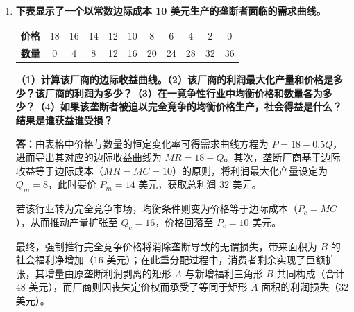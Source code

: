 \begin{enumerate}[label=\textbf{\arabic*.}, leftmargin=*]
		\textbf{答：}在征税前，根据利润函数 $\pi = PQ - C$ 的一阶最大化条件，厂商的边际收益必须等于边际成本。对利润函数求导可得：
		\[
		\begin{aligned}
			\frac{\mathrm{d}\pi}{\mathrm{d}Q} &= \frac{\mathrm{d}}{\mathrm{d}Q} [(120 - 0.02Q)Q - (60Q + 25000)] \\
			&= 60 - 0.04Q = 0
		\end{aligned}
		\]
		解得均衡产量 $Q = 1500$，代入需求曲线得均衡价格 $P = 90$ 美分，此时每周总利润为 $20000$ 美分（即 $200$ 美元）。当政府决定对该产品征收每单位 $14$ 美分的从量税时，厂商的边际成本向上平移，新的利润函数重构为：
		\[
		\begin{aligned}
			\pi &= (120 - 0.02Q)Q - (74Q + 25000) \\
			&= -0.02Q^2 + 46Q - 25000
		\end{aligned}
		\]
		最终，再次应用利润最大化条件，求导可得 $0.04Q = 46$，解得税后产量缩减至 $Q = 1150$，对应的市场价格上升至 $P = 97$ 美分，导致税后每周总利润下降至 $1450$ 美分（即 $14.5$ 美元）。
		\newpage
		\item \textbf{下表显示了一个以常数边际成本 10 美元生产的垄断者面临的需求曲线。}
		\begin{center}
			\begin{tabular}{lcccccccccc}
				\hline
				\textbf{价格} & 18 & 16 & 14 & 12 & 10 & 8 & 6 & 4 & 2 & 0 \\
				\textbf{数量} & 0 & 4 & 8 & 12 & 16 & 20 & 24 & 28 & 32 & 36 \\
				\hline
			\end{tabular}
		\end{center}
		\textbf{（1）计算该厂商的边际收益曲线。（2）该厂商的利润最大化产量和价格是多少？该厂商的利润为多少？（3）在一竞争性行业中均衡价格和数量各为多少？（4）如果该垄断者被迫以完全竞争的均衡价格生产，社会得益是什么？结果是谁获益谁受损？}
		
		\textbf{答：}由表格中价格与数量的恒定变化率可得需求曲线方程为 $P = 18 - 0.5Q$，进而导出其对应的边际收益曲线为 $MR = 18 - Q$。其次，垄断厂商基于边际收益等于边际成本（$MR = MC = 10$）的原则，将利润最大化产量设定为 $Q_m = 8$，此时要价 $P_m = 14$ 美元，获取总利润 $32$ 美元。
		
		若该行业转为完全竞争市场，均衡条件则变为价格等于边际成本（$P_c = MC$），从而推动产量扩张至 $Q_c = 16$，价格回落至 $P_c = 10$ 美元。
		
		最终，强制推行完全竞争价格将消除垄断导致的无谓损失，带来面积为 $B$ 的社会福利净增加（$16$ 美元）；在此重分配过程中，消费者剩余实现了巨额扩张，其增量由原垄断利润剥离的矩形 $A$ 与新增福利三角形 $B$ 共同构成（合计 $48$ 美元），而厂商则因丧失定价权而承受了等同于矩形 $A$ 面积的利润损失（$32$ 美元）。
		

\end{enumerate}
